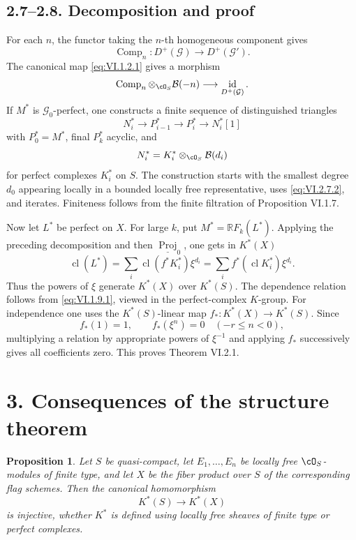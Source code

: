 \documentclass[11pt]{article}
\theoremstyle{plain}
\newtheorem{proposition}[theorem]{Proposition}
\theoremstyle{definition}
\theoremstyle{remark}
\newcommand{\RR}{\mathbb R}
\DeclareMathOperator{\Proj}{Proj}
\DeclareMathOperator{\id}{id}
\DeclareMathOperator{\cl}{cl}
\providecommand{\Comp}{\operatorname{Comp}}
\begin{document}
\subsection*{2.7--2.8. Decomposition and proof}
For each $n$, the functor taking the $n$-th homogeneous component gives
\[
\Comp_n:D^+(\mathcal G)\longrightarrow D^+(\mathcal G').
\]
The canonical map \eqref{eq:VI.1.2.1} gives a morphism
\begin{equation}\label{eq:VI.2.7.2}
\Comp_n\otimes_{\cO_S}\mathcal B(-n)\longrightarrow\id_{D^+(\mathcal G)}.
\end{equation}
If $M^*$ is $\mathcal G_0$-perfect, one constructs a finite sequence of distinguished triangles
\[
N_i^*\to P_{i-1}^*\to P_i^*\to N_i^*[1]
\]
with $P_0^*=M^*$, final $P_k^*$ acyclic, and
\[
N_i^*=K_i^*\otimes_{\cO_S}\mathcal B(d_i)
\]
for perfect complexes $K_i^*$ on $S$. The construction starts with the smallest degree $d_0$ appearing locally in a bounded locally free representative, uses \eqref{eq:VI.2.7.2}, and iterates. Finiteness follows from the finite filtration of Proposition VI.1.7.

Now let $L^*$ be perfect on $X$. For large $k$, put $M^*=\RR F_k(L^*)$. Applying the preceding decomposition and then $\underline{\Proj}_0$, one gets in $K^*(X)$
\[
\cl(L^*)=\sum_i\cl(f^*K_i^*)\xi^{d_i}=\sum_if^*(\cl K_i^*)\xi^{d_i}.
\]
Thus the powers of $\xi$ generate $K^*(X)$ over $K^*(S)$. The dependence relation follows from \eqref{eq:VI.1.9.1}, viewed in the perfect-complex $K$-group. For independence one uses the $K^*(S)$-linear map $f_*:K^*(X)\to K^*(S)$. Since
\[
f_*(1)=1,
\qquad
f_*(\xi^n)=0\quad(-r\leq n<0),
\]
multiplying a relation by appropriate powers of $\xi^{-1}$ and applying $f_*$ successively gives all coefficients zero. This proves Theorem VI.2.1.

\section*{3. Consequences of the structure theorem}

\begin{proposition}\label{prop:VI.3.1}
Let $S$ be quasi-compact, let $E_1,\ldots,E_n$ be locally free $\cO_S$-modules of finite type, and let $X$ be the fiber product over $S$ of the corresponding flag schemes. Then the canonical homomorphism
\[
K^*(S)\longrightarrow K^*(X)
\]
is injective, whether $K^*$ is defined using locally free sheaves of finite type or perfect complexes.
\end{proposition}
\end{document}
